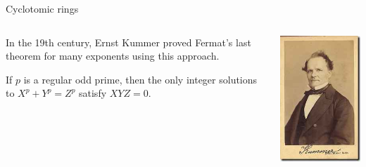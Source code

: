 \documentclass[10pt]{beamer}
\theoremstyle{definition}
\begin{document}
\begin{frame}[t]{Cyclotomic rings}

\begin{columns}[T]

\begin{column}{0.8\textwidth}
In the 19th century, Ernst Kummer proved Fermat's last theorem for many exponents using this approach.

\vspace{0.5cm}

\begin{theorem}[Kummer]
If $ p $ is a regular odd prime, then the only integer solutions to $ X^p + Y^p = Z^p $ satisfy $ XYZ = 0 $.
\end{theorem}
\end{column}

\begin{column}{0.1\textwidth}
\hspace{-1cm}
\includegraphics[width=1.5\textwidth]{kummer.jpg}
\end{column}


\end{columns}
\end{frame}
\end{document}
